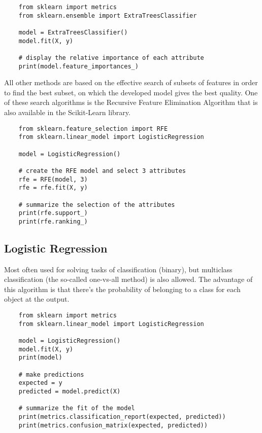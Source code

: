 \documentclass[a4paper,12pt]{article}
\begin{document}
\begin{framed}
	\begin{verbatim}
	from sklearn import metrics
	from sklearn.ensemble import ExtraTreesClassifier
	
	model = ExtraTreesClassifier()
	model.fit(X, y)
	
	# display the relative importance of each attribute
	print(model.feature_importances_)
	\end{verbatim}
\end{framed}
All other methods are based on the effective search of subsets of features in order to find the best subset, on which the developed model gives the best quality. One of these search algorithms is the Recursive Feature Elimination Algorithm that is also available in the Scikit-Learn library.

\begin{framed}
	\begin{verbatim}
	from sklearn.feature_selection import RFE
	from sklearn.linear_model import LogisticRegression
	
	model = LogisticRegression()
	
	# create the RFE model and select 3 attributes
	rfe = RFE(model, 3)
	rfe = rfe.fit(X, y)
	
	# summarize the selection of the attributes
	print(rfe.support_)
	print(rfe.ranking_)
	\end{verbatim}
\end{framed}
\newpage

\subsection{Logistic Regression}
Most often used for solving tasks of classification (binary), but multiclass classification (the so-called one-vs-all method) is also allowed. The advantage of this algorithm is that there’s the probability of belonging to a class for each object at the output.

\begin{framed}
	\begin{verbatim}
	from sklearn import metrics
	from sklearn.linear_model import LogisticRegression
	
	model = LogisticRegression()
	model.fit(X, y)
	print(model)
	
	# make predictions
	expected = y
	predicted = model.predict(X)
		
	# summarize the fit of the model
	print(metrics.classification_report(expected, predicted))
	print(metrics.confusion_matrix(expected, predicted))
	\end{verbatim}
\end{framed}
\newpage
\end{document}
